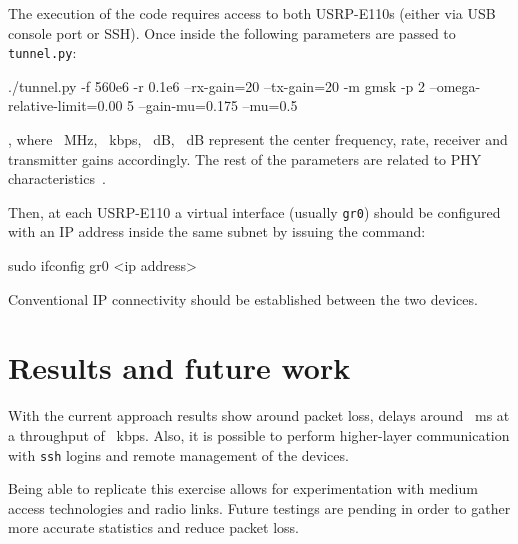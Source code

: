 \documentclass[a4paper,journal]{IEEEtran}
\begin{document}
The execution of the code requires access to both USRP-E110s (either via USB console port or SSH). Once inside the following parameters are passed to \verb|tunnel.py|:

\begin{code}
 ./tunnel.py -f 560e6 -r 0.1e6 
 --rx-gain=20 --tx-gain=20 -m gmsk -p 2 
 --omega-relative-limit=0.00 5 
 --gain-mu=0.175 --mu=0.5 
\end{code}

, where ~MHz, ~kbps, ~dB, ~dB represent the center frequency, rate, receiver and transmitter gains accordingly. The rest of the parameters are related to PHY characteristics~\cite{PHY_parameters}.

Then, at each USRP-E110 a virtual interface (usually \verb|gr0|) should be configured with an IP address inside the same subnet by issuing the command: 

\begin{code}
  sudo ifconfig gr0 <ip address>
\end{code}

Conventional IP connectivity should be established between the two devices.  
\section{Results and future work}
  With the current approach results show around  packet loss, delays around ~ms at a throughput of ~kbps. Also, it is possible to perform higher-layer communication with \verb|ssh| logins and remote management of the devices.

Being able to replicate this exercise allows for experimentation with medium access technologies and radio links. Future testings are pending in order to gather more accurate statistics and reduce packet loss.   
  


\end{document}
